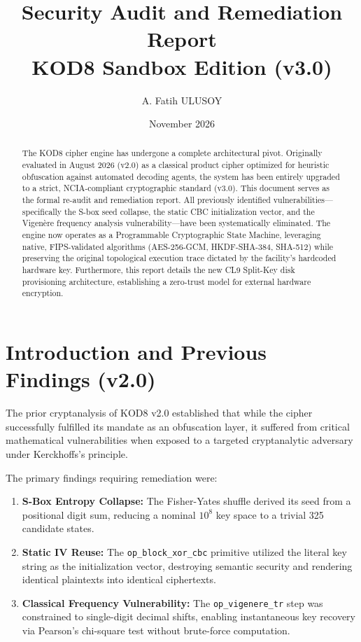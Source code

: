 \documentclass[11pt]{article}
\title{\textbf{Security Audit and Remediation Report\\
KOD8 Sandbox Edition (v3.0)}}
\author{A. Fatih ULUSOY}
\date{November 2026}
\begin{document}
\maketitle

\begin{abstract}
\noindent
The KOD8 cipher engine has undergone a complete architectural pivot. Originally evaluated in August 2026 (v2.0) as a classical product cipher optimized for heuristic obfuscation against automated decoding agents, the system has been entirely upgraded to a strict, NCIA-compliant cryptographic standard (v3.0). This document serves as the formal re-audit and remediation report. All previously identified vulnerabilities---specifically the S-box seed collapse, the static CBC initialization vector, and the Vigen\`ere frequency analysis vulnerability---have been systematically eliminated. The engine now operates as a Programmable Cryptographic State Machine, leveraging native, FIPS-validated algorithms (AES-256-GCM, HKDF-SHA-384, SHA-512) while preserving the original topological execution trace dictated by the facility's hardcoded hardware key. Furthermore, this report details the new CL9 Split-Key disk provisioning architecture, establishing a zero-trust model for external hardware encryption.
\end{abstract}

\tableofcontents
\newpage

\section{Introduction and Previous Findings (v2.0)}

The prior cryptanalysis of KOD8 v2.0 established that while the cipher successfully fulfilled its mandate as an obfuscation layer, it suffered from critical mathematical vulnerabilities when exposed to a targeted cryptanalytic adversary under Kerckhoffs's principle. 

The primary findings requiring remediation were:
\begin{enumerate}[leftmargin=1.6em]
    \item \textbf{S-Box Entropy Collapse:} The Fisher-Yates shuffle derived its seed from a positional digit sum, reducing a nominal $10^8$ key space to a trivial 325 candidate states.
    \item \textbf{Static IV Reuse:} The \texttt{op\_block\_xor\_cbc} primitive utilized the literal key string as the initialization vector, destroying semantic security and rendering identical plaintexts into identical ciphertexts.
    \item \textbf{Classical Frequency Vulnerability:} The \texttt{op\_vigenere\_tr} step was constrained to single-digit decimal shifts, enabling instantaneous key recovery via Pearson's chi-square test without brute-force computation.
\end{enumerate}
\end{document}
